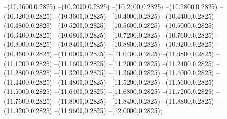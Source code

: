 {	--(10.1600,0.2825)
	--(10.2000,0.2825)
	--(10.2400,0.2825)
	--(10.2800,0.2825)
	--(10.3200,0.2825)
	--(10.3600,0.2825)
	--(10.4000,0.2825)
	--(10.4400,0.2825)
	--(10.4800,0.2825)
	--(10.5200,0.2825)
	--(10.5600,0.2825)
	--(10.6000,0.2825)
	--(10.6400,0.2825)
	--(10.6800,0.2825)
	--(10.7200,0.2825)
	--(10.7600,0.2825)
	--(10.8000,0.2825)
	--(10.8400,0.2825)
	--(10.8800,0.2825)
	--(10.9200,0.2825)
	--(10.9600,0.2825)
	--(11.0000,0.2825)
	--(11.0400,0.2825)
	--(11.0800,0.2825)
	--(11.1200,0.2825)
	--(11.1600,0.2825)
	--(11.2000,0.2825)
	--(11.2400,0.2825)
	--(11.2800,0.2825)
	--(11.3200,0.2825)
	--(11.3600,0.2825)
	--(11.4000,0.2825)
	--(11.4400,0.2825)
	--(11.4800,0.2825)
	--(11.5200,0.2825)
	--(11.5600,0.2825)
	--(11.6000,0.2825)
	--(11.6400,0.2825)
	--(11.6800,0.2825)
	--(11.7200,0.2825)
	--(11.7600,0.2825)
	--(11.8000,0.2825)
	--(11.8400,0.2825)
	--(11.8800,0.2825)
	--(11.9200,0.2825)
	--(11.9600,0.2825)
	--(12.0000,0.2825);
}
